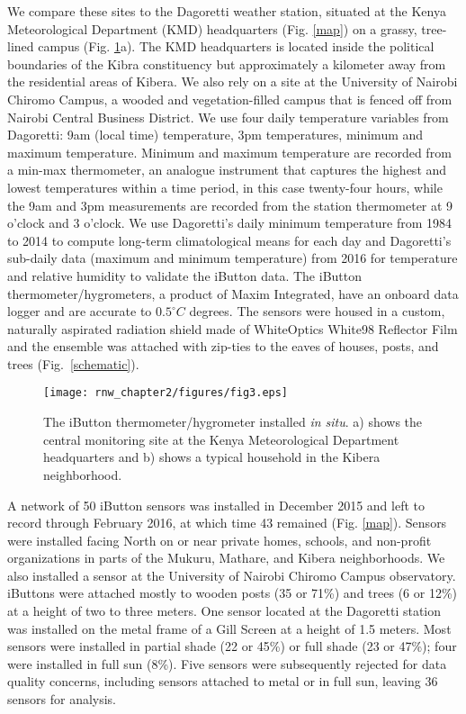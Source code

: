 We compare these sites to the Dagoretti weather station, situated at the Kenya Meteorological Department (KMD) headquarters (Fig. \ref{map}) on a grassy, tree-lined campus (Fig. \ref{photos}a). The KMD headquarters is located inside the political boundaries of the Kibra constituency but approximately a kilometer away from the residential areas of Kibera.  We also rely on a site at the University of Nairobi Chiromo Campus, a wooded and vegetation-filled campus that is fenced off from Nairobi Central Business District. We use four daily temperature variables from Dagoretti: 9am (local time)  temperature, 3pm temperatures, minimum and maximum temperature. Minimum and maximum temperature are recorded from a min-max thermometer, an analogue instrument that captures the highest and lowest temperatures within a time period, in this case twenty-four hours, while the 9am and 3pm measurements are recorded from the station thermometer at 9 o'clock and 3 o'clock. 
We use Dagoretti's daily minimum temperature from 1984 to 2014 to compute long-term climatological means for each day and Dagoretti's sub-daily data (maximum and minimum temperature) from 2016 for temperature and relative humidity to validate the iButton data. The iButton thermometer/hygrometers, a product of Maxim Integrated, have an onboard data logger and are accurate to $0.5^\circ C$ degrees. The sensors were housed in a custom, naturally aspirated radiation shield made of WhiteOptics White98 Reflector Film and the ensemble was attached with zip-ties to the eaves of houses, posts, and trees (Fig.~\ref{schematic}). 

\begin{figure}
\texttt{[image: rnw\_chapter2/figures/fig3.eps]}
\caption{The iButton thermometer/hygrometer installed \textit{in situ}. a) shows the central monitoring site at the Kenya Meteorological Department headquarters and b) shows a typical household in the Kibera neighborhood. }
\label{photos}
\end{figure}

A network of 50 iButton sensors was installed in December 2015 and left to record through February 2016, at which time 43 remained (Fig. \ref{map}). Sensors were installed facing North on or near private homes, schools, and non-profit organizations in parts of the Mukuru, Mathare, and Kibera neighborhoods. We also installed a sensor at the University of Nairobi Chiromo Campus observatory. iButtons were attached mostly to wooden posts (35 or 71\%) and trees (6 or 12\%) at a height of two to three meters. One sensor located at the Dagoretti station was installed on the metal frame of a Gill Screen at a height of 1.5 meters.  Most sensors were installed in partial shade (22 or 45\%) or  full shade (23 or 47\%); four were installed in full sun (8\%). 
Five sensors were subsequently rejected for data quality concerns, including sensors attached to metal or in full sun, leaving 36 sensors for analysis.

